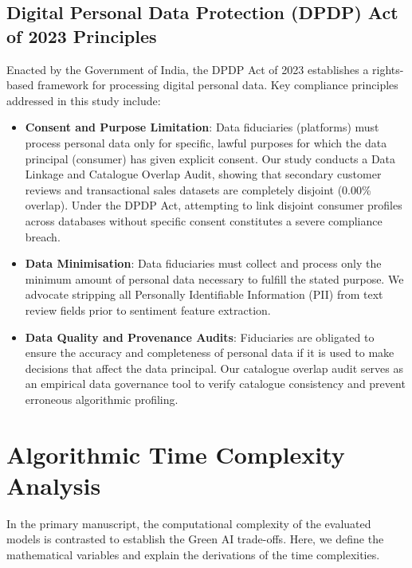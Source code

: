\documentclass[11pt]{article}
\begin{document}
\subsection{Digital Personal Data Protection (DPDP) Act of 2023 Principles}
Enacted by the Government of India, the DPDP Act of 2023 establishes a rights-based framework for processing digital personal data. Key compliance principles addressed in this study include:
\begin{itemize}
    \item \textbf{Consent and Purpose Limitation}: Data fiduciaries (platforms) must process personal data only for specific, lawful purposes for which the data principal (consumer) has given explicit consent. Our study conducts a Data Linkage and Catalogue Overlap Audit, showing that secondary customer reviews and transactional sales datasets are completely disjoint (0.00\% overlap). Under the DPDP Act, attempting to link disjoint consumer profiles across databases without specific consent constitutes a severe compliance breach.
    \item \textbf{Data Minimisation}: Data fiduciaries must collect and process only the minimum amount of personal data necessary to fulfill the stated purpose. We advocate stripping all Personally Identifiable Information (PII) from text review fields prior to sentiment feature extraction.
    \item \textbf{Data Quality and Provenance Audits}: Fiduciaries are obligated to ensure the accuracy and completeness of personal data if it is used to make decisions that affect the data principal. Our catalogue overlap audit serves as an empirical data governance tool to verify catalogue consistency and prevent erroneous algorithmic profiling.
\end{itemize}

\section{Algorithmic Time Complexity Analysis}
In the primary manuscript, the computational complexity of the evaluated models is contrasted to establish the Green AI trade-offs. Here, we define the mathematical variables and explain the derivations of the time complexities.
\end{document}
